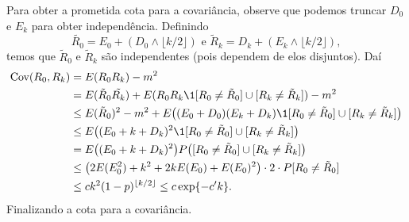 Para obter a prometida cota para a covariância, observe que podemos truncar $D_0$ e $E_k$ para obter independência.
Definindo
\begin{equation}
  \tilde{R_0} = E_0 + ( D_0 \wedge \lfloor k/2 \rfloor ) \text{ e } \tilde{R}_k = D_k + ( E_k \wedge \lfloor k/2 \rfloor ),
\end{equation}
temos que $\tilde{R}_0$ e $\tilde{R}_k$ são independentes (pois dependem de elos disjuntos).
Daí
\begin{equation}
  \begin{split}
    \text{Cov}(R_0, R_k) & = E(R_0 R_k) - m^2\\
    & = E(\tilde{R}_0 \tilde{R_k}) + E(R_0 R_k \1{[R_0 \neq \tilde{R}_0] \cup [R_k \neq \tilde{R}_k]}) - m^2\\
    & \leq E(\tilde{R}_0)^2 - m^2 + E\big( (E_0 + D_0) (E_k + D_k) \1{[R_0 \neq \tilde{R}_0] \cup [R_k \neq \tilde{R}_k]}\big)\\
    & \leq E\big( (E_0 + k + D_k)^2 \1{[R_0 \neq \tilde{R}_0] \cup [R_k \neq \tilde{R}_k]}\big)\\
    & = E\big( (E_0 + k + D_k)^2 \big) P\big([R_0 \neq \tilde{R}_0] \cup[R_k \neq \tilde{R}_k]\big)\\
    & \leq \big( 2 E(E_0^2) + k^2 + 2k E(E_0) + E(E_0)^2 \big) \cdot 2 \cdot P[R_0 \neq \tilde{R}_0]\\
    & \leq c k^2 (1-p)^{\lfloor k/2 \rfloor} \leq c \exp \{-c' k\}.
  \end{split}
\end{equation}
Finalizando a cota para a covariância.

